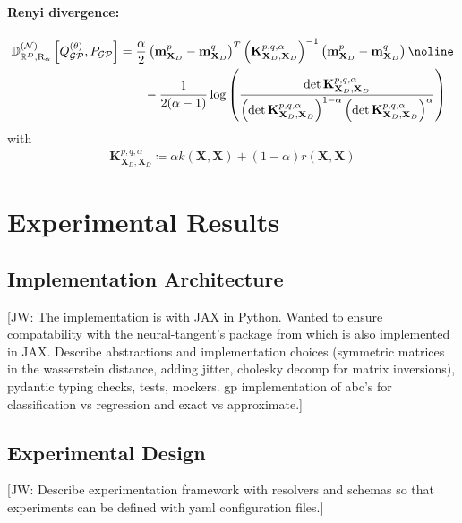 \documentclass{article}
\newcommand{\jw}[1]{{\color{gray} [JW: #1]}}
\newcommand{\GP}{\operatorname{\mathcal{GP}}}
\numberwithin{equation}{section}
\begin{document}
\paragraph{Renyi divergence:} 
\begin{align}
    \mathbb{D}_{\mathbb{R}^D, \text{R}_\alpha}^{(\mathcal{N})} \left[Q_{\GP}^{(\theta)}, P_{\GP}\right] &= \frac{\alpha}{2}\left(\mathbf{m}_{\mathbf{X}_D}^p - \mathbf{m}_{\mathbf{X}_D}^q\right)^T \left(\mathbf{K}_{\mathbf{X}_D, \mathbf{X}_D}^{p, q, \alpha}\right)^{-1}\left(\mathbf{m}_{\mathbf{X}_D}^p - \mathbf{m}_{\mathbf{X}_D}^q\right) \noline \\
    & \qquad - \frac{1}{2(\alpha -1)} \log\left(\frac{\det \mathbf{K}_{\mathbf{X}_D, \mathbf{X}_D}^{p, q, \alpha}}{\left(\det \mathbf{K}_{\mathbf{X}_D, \mathbf{X}_D}^{p, q, \alpha}\right)^{1-\alpha}\left(\det \mathbf{K}_{\mathbf{X}_D, \mathbf{X}_D}^{p, q, \alpha}\right)^{\alpha}}\right)
\end{align}
with 
\begin{align}
    \mathbf{K}_{\mathbf{X}_D, \mathbf{X}_D}^{p, q, \alpha} \coloneqq \alpha  k(\mathbf{X}, \mathbf{X}) + (1-\alpha)  r(\mathbf{X}, \mathbf{X})
\end{align}
\newpage
\section{Experimental Results}
\subsection{Implementation Architecture}

\jw{The implementation is with JAX in Python. Wanted to ensure compatability with the neural-tangent's package from \cite{novak2019neural} which is also implemented in JAX. Describe abstractions and implementation choices (symmetric matrices in the wasserstein distance, adding jitter, cholesky decomp for matrix inversions), pydantic typing checks, tests, mockers. gp implementation of abc's for classification vs regression and exact vs approximate.}

\subsection{Experimental Design}
\jw{Describe experimentation framework with resolvers and schemas so that experiments can be defined with yaml configuration files.}
\end{document}
